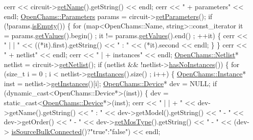\begin{DoxyCodeInclude}
    cerr << circuit->\hyperlink{class_open_chams_1_1_circuit_a2858c0c4e8b5108f041237cf5a802029}{getName}().getString() << endl;
    cerr << \textcolor{stringliteral}{" + parameters"} << endl;
    \hyperlink{class_open_chams_1_1_parameters}{OpenChams::Parameters} params = circuit->\hyperlink{class_open_chams_1_1_circuit_a2e51ad4344607fc279c5c8cda4edae02}{getParameters}();
    \textcolor{keywordflow}{if} (!params.\hyperlink{class_open_chams_1_1_parameters_af337ffd75e4f019ce15302c60715d84b}{isEmpty}()) \{
        \textcolor{keywordflow}{for} (map<OpenChams::Name, string>::const\_iterator it = params.\hyperlink{class_open_chams_1_1_parameters_a0f890d16c3b2a0bcbdf060854ea07877}{getValues}().begin() ; it != 
      params.\hyperlink{class_open_chams_1_1_parameters_a0f890d16c3b2a0bcbdf060854ea07877}{getValues}().end() ; ++it) \{
            cerr << \textcolor{stringliteral}{" | | "} << ((*it).first).getString() << \textcolor{stringliteral}{" : "} << (*it).second << endl;
        \}
    \}
    cerr << \textcolor{stringliteral}{" + netlist"} << endl;
    cerr << \textcolor{stringliteral}{" | + instances"} << endl;
    \hyperlink{class_open_chams_1_1_netlist}{OpenChams::Netlist}* netlist = circuit->\hyperlink{class_open_chams_1_1_circuit_a4085d6a7b6958ffdd7ab5df7e6d6e53f}{getNetlist}();
    \textcolor{keywordflow}{if} (netlist && !netlist->\hyperlink{class_open_chams_1_1_netlist_adab62a25face462baec9a7fffb2b6158}{hasNoInstances}()) \{
        \textcolor{keywordflow}{for} (\textcolor{keywordtype}{size\_t} i = 0 ; i < netlist->\hyperlink{class_open_chams_1_1_netlist_a8e6e58ffab876152a740092520c35d73}{getInstances}().size() ; i++) \{
            \hyperlink{class_open_chams_1_1_instance}{OpenChams::Instance}* inst = netlist->\hyperlink{class_open_chams_1_1_netlist_a8e6e58ffab876152a740092520c35d73}{getInstances}()[i];
            \hyperlink{class_open_chams_1_1_device}{OpenChams::Device}*   dev  = NULL;
            \textcolor{keywordflow}{if} (dynamic\_cast<OpenChams::Device*>(inst)) \{
                dev = \textcolor{keyword}{static\_cast<}\hyperlink{class_open_chams_1_1_device}{OpenChams::Device}*\textcolor{keyword}{>}(inst);
                cerr << \textcolor{stringliteral}{" | | + "} << dev->getName().getString() << \textcolor{stringliteral}{" : "} << dev->getModel().getString() << \textcolor{stringliteral}{
      " - "} << dev->getOrder() << \textcolor{stringliteral}{" - "} << dev->\hyperlink{class_open_chams_1_1_device_a831ce553c23908f447a5be332ecd5946}{getMosType}().getString() << \textcolor{stringliteral}{" - "} << (dev->
      \hyperlink{class_open_chams_1_1_device_a29ed1982e1a8b3a634df8d0c70039669}{isSourceBulkConnected}()?\textcolor{stringliteral}{"true"}:\textcolor{stringliteral}{"false"}) << endl;

\end{DoxyCodeInclude}
